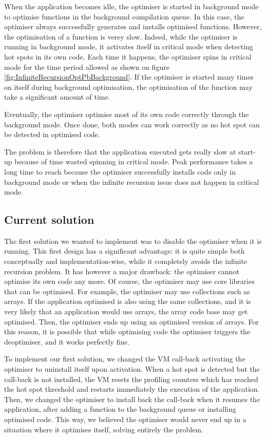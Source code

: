 \documentclass[a4paper,12pt,twoside]{../includes/ThesisStyle}
\begin{document}
When the application becomes idle, the optimiser is started in background mode to optimise functions in the background compilation queue. In this case, the optimiser always successfully generates and installs optimised functions. However, the optimisation of a function is verey slow. Indeed, while the optimiser is running in background mode, it activates itself in critical mode when detecting hot spots in its own code. Each time it happens, the optimiser spins in critical mode for the time period allowed as shown on figure \ref{fig:InfiniteRecursionOptPbBackground}. If the optimiser is started many times on itself during background optimisation, the optimisation of the function may take a significant amount of time. 

Eventually, the optimiser optimise most of its own code correctly through the background mode. Once done, both modes can work correctly as no hot spot can be detected in optimised code.

The problem is therefore that the application executed gets really slow at start-up because of time wasted spinning in critical mode. Peak performance takes a long time to reach because the optimiser successfully installs code only in background mode or when the infinite recursion issue does not happen in critical mode. 

\subsection{Current solution}

The first solution we wanted to implement was to disable the optimiser when it is running. This first design has a significant advantage: it is quite simple both conceptually and implementation-wise, while it completely avoids the infinite recursion problem. It has however a major drawback: the optimiser cannot optimise its own code any more. Of course, the optimiser may use core libraries that can be optimised. For example, the optimiser may use collections such as arrays. If the application optimised is also using the same collections, and it is very likely that an application would use arrays, the array code base may get optimised. Then, the optimiser ends up using an optimised version of arrays. For this reason, it is possible that while optimising code the optimiser triggers the deoptimiser, and it works perfectly fine.

To implement our first solution, we changed the VM call-back activating the optimiser to uninstall itself upon activation. When a hot spot is detected but the call-back is not installed, the VM resets the profiling counters which has reached the hot spot threshold and restarts immediately the execution of the application. Then, we changed the optimiser to install back the call-back when it resumes the application, after adding a function to the background queue or installing optimised code. This way, we believed the optimiser would never end up in a situation where it optimises itself, solving entirely the problem.
\end{document}
